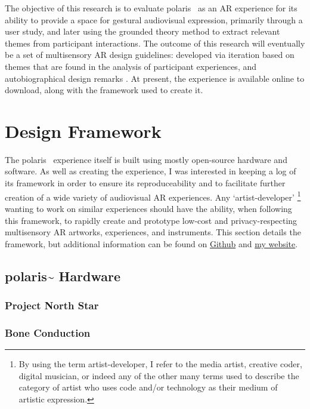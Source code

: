 The objective of this research is to evaluate polaris~ as an AR experience for its ability to provide a space for gestural audiovisual expression, primarily through a user study, and later using the grounded theory method to extract relevant themes from participant interactions. The outcome of this research will eventually be a set of multisensory AR design guidelines: developed via iteration based on themes that are found in the analysis of participant experiences, and autobiographical design remarks \citep{neustaedter2012}. At present, the experience is available online to download, along with the framework used to create it.



\section{Design Framework}\label{sec: polaris-framework}
The polaris~ experience itself is built using mostly open-source hardware and software. As well as creating the experience, I was interested in keeping a log of its framework in order to ensure its reproduceability and to facilitate further creation of a wide variety of audiovisual AR experiences. Any ‘artist-developer’ \footnote{By using the term artist-developer, I refer to the media artist, creative coder, digital musician, or indeed any of the other many terms used to describe the category of artist who uses code and/or technology as their medium of artistic expression.} wanting to work on similar experiences should have the ability, when following this framework, to rapidly create and prototype low-cost and privacy-respecting multisensory AR artworks, experiences, and instruments. This section details the framework, but additional information can be found on \href{https://github.com/sambilbow/polaris}{Github} and \href{https://sambilbow.com}{my website}.

\subsection{polaris\textasciitilde{} Hardware}\label{sec: polaris-framework-hardware}
\subsubsection{Project North Star}\label{sec: polaris-framework-hardware-pns}
\subsubsection{Bone Conduction}\label{sec: polaris-framework-hardware-bc}

